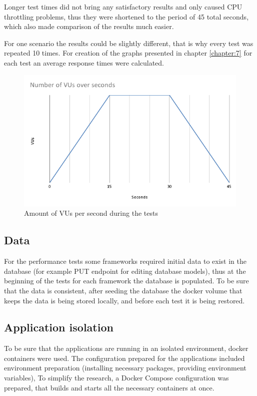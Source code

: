 Longer test times did not bring any satisfactory results and only caused CPU throttling problems, thus they were shortened to the period of 45 total seconds, which also made comparison of the results much easier.

For one scenario the results could be slightly different, that is why every test was repeated 10 times. For creation of the graphs presented in chapter \ref{chapter:7} for each test an average response times were calculated. %

\begin{figure}[H]
    \includegraphics[width=\columnwidth]{pictures/vusPerSecond.png}
    \caption{Amount of VUs per second during the tests}
    \label{fig:vusPerSecond}
\end{figure}


\subsection{Data}

For the performance tests some frameworks required initial data to exist in the database (for example PUT endpoint for editing database models), thus at the beginning of the tests for each framework the database is populated. To be sure that the data is consistent, after seeding the database the docker volume that keeps the data is being stored locally, and before each test it is being restored.

\subsection{Application isolation}

To be sure that the applications are running in an isolated environment, docker containers were used. The configuration prepared for the applications included environment preparation (installing necessary packages, providing environment variables), To simplify the research, a Docker Compose configuration was prepared, that builds and starts all the necessary containers at once.

